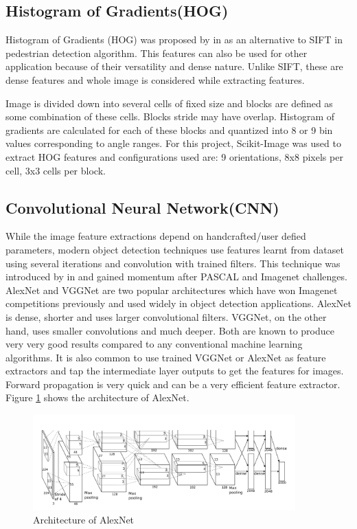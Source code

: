 \documentclass[12pt]{article}
\begin{document}
\subsection{Histogram of Gradients(HOG)}\label{sec:hog_lit}
Histogram of Gradients (HOG) was proposed by \citet{ref:hog} in \citeyear{ref:hog} as an alternative to SIFT in pedestrian detection algorithm. This features can also be used for other application because of their versatility and dense nature. Unlike SIFT, these are dense features and whole image is considered while extracting features. 

Image is divided down into several cells of fixed size and blocks are defined as some combination of these cells. Blocks stride may have overlap. Histogram of gradients are calculated for each of these blocks and quantized into 8 or 9 bin values corresponding to angle ranges. For this project, Scikit-Image \cite{ref:scikit-image} was used to extract HOG features and configurations used are:  9 orientations,  8x8 pixels per cell,  3x3 cells per block.

\subsection{Convolutional Neural Network(CNN)}\label{sec:cnn_lit}
While the image feature extractions depend on handcrafted/user defied parameters, modern object detection techniques use features learnt from dataset using several iterations and convolution with trained filters. This technique was introduced by \citet{ref:lecun} in \citeyear{ref:lecun} and gained momentum after PASCAL and Imagenet challenges. AlexNet \citep{ref:alexnet} and VGGNet \citep{ref:vggnet} are two popular architectures which have won Imagenet competitions previously and used widely in object detection applications. AlexNet is dense, shorter and uses larger convolutional filters. VGGNet, on the other hand, uses smaller convolutions and much deeper. Both are known to produce very very good results compared to any conventional machine learning algorithms. It is also common to use trained VGGNet or AlexNet as feature extractors and tap the intermediate layer outputs to get the features for images. Forward propagation is very quick and can be a very efficient feature extractor. Figure \ref{img:alexnet} shows the architecture of AlexNet.
\begin{figure}[H]
\centering
\includegraphics[width=0.9\textwidth]{images/alexnet.png} 
\caption{Architecture of AlexNet}
\label{img:alexnet}
\end{figure}
\end{document}
